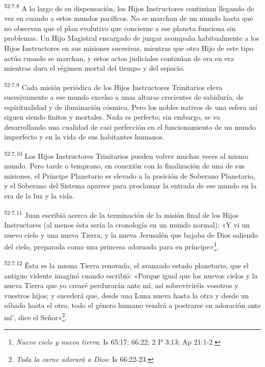 \par
\textsuperscript{52:7.8} A lo largo de su dispensación, los Hijos Instructores continúan llegando de vez en cuando a estos mundos pacíficos. No se marchan de un mundo hasta que no observan que el plan evolutivo que concierne a ese planeta funciona sin problemas. Un Hijo Magistral encargado de juzgar acompaña habitualmente a los Hijos Instructores en sus misiones sucesivas, mientras que otro Hijo de este tipo actúa cuando se marchan, y estos actos judiciales continúan de era en era mientras dura el régimen mortal del tiempo y del espacio.

\par
\textsuperscript{52:7.9} Cada misión periódica de los Hijos Instructores Trinitarios eleva sucesivamente a ese mundo excelso a unas alturas crecientes de sabiduría, de espiritualidad y de iluminación cósmica. Pero los nobles nativos de una esfera así siguen siendo finitos y mortales. Nada es perfecto; sin embargo, se va desarrollando una cualidad de casi perfección en el funcionamiento de un mundo imperfecto y en la vida de sus habitantes humanos.

\par
\textsuperscript{52:7.10} Los Hijos Instructores Trinitarios pueden volver muchas veces al mismo mundo. Pero tarde o temprano, en conexión con la finalización de una de sus misiones, el Príncipe Planetario es elevado a la posición de Soberano Planetario, y el Soberano del Sistema aparece para proclamar la entrada de ese mundo en la era de la luz y la vida.

\par
\textsuperscript{52:7.11} Juan escribió acerca de la terminación de la misión final de los Hijos Instructores (al menos ésta sería la cronología en un mundo normal): «Y vi un nuevo cielo y una nueva Tierra, y la nueva Jerusalén que bajaba de Dios saliendo del cielo, preparada como una princesa adornada para su príncipe»\footnote{\textit{Nuevo cielo y nueva tierra}: Is 65:17; 66:22; 2 P 3:13; Ap 21:1-2.}.

\par
\textsuperscript{52:7.12} Ésta es la misma Tierra renovada, el avanzado estado planetario, que el antiguo vidente imaginó cuando escribió: «Porque igual que los nuevos cielos y la nueva Tierra que yo crearé perdurarán ante mí, así sobreviviréis vosotros y vuestros hijos; y sucederá que, desde una Luna nueva hasta la otra y desde un sábado hasta el otro, todo el género humano vendrá a postrarse en adoración ante mí', dice el Señor»\footnote{\textit{Toda la carne adorará a Dios}: Is 66:22-23.}.

